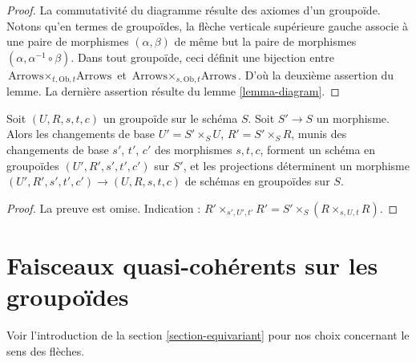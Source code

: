 \begin{proof}
La commutativité du diagramme résulte des axiomes d'un groupoïde.
Notons qu'en termes de groupoïdes, la flèche verticale supérieure gauche associe
à une paire de morphismes $(\alpha, \beta)$ de même but la paire
de morphismes $(\alpha, \alpha^{-1} \circ \beta)$. Dans tout groupoïde,
ceci définit une bijection entre
$\text{Arrows} \times_{t, \text{Ob}, t} \text{Arrows}$
et
$\text{Arrows} \times_{s, \text{Ob}, t} \text{Arrows}$. D'où la deuxième
assertion du lemme.
La dernière assertion résulte du lemme \ref{lemma-diagram}.
\end{proof}

\begin{lemma}
\label{lemma-base-change-groupoid}
Soit $(U, R, s, t, c)$ un groupoïde sur le schéma $S$.
Soit $S' \to S$ un morphisme. Alors les changements de base $U' = S' \times_S U$,
$R' = S' \times_S R$, munis des changements de base $s'$, $t'$, $c'$
des morphismes $s, t, c$, forment un schéma en groupoïdes
$(U', R', s', t', c')$ sur $S'$, et les projections
déterminent un morphisme
$(U', R', s', t', c') \to (U, R, s, t, c)$
de schémas en groupoïdes sur $S$.
\end{lemma}

\begin{proof}
La preuve est omise. Indication :
$R' \times_{s', U', t'} R' = S' \times_S (R \times_{s, U, t} R)$.
\end{proof}









\section{Faisceaux quasi-cohérents sur les groupoïdes}
\label{section-groupoids-quasi-coherent}

\noindent
Voir l'introduction de la section \ref{section-equivariant} pour nos
choix concernant le sens des flèches.


